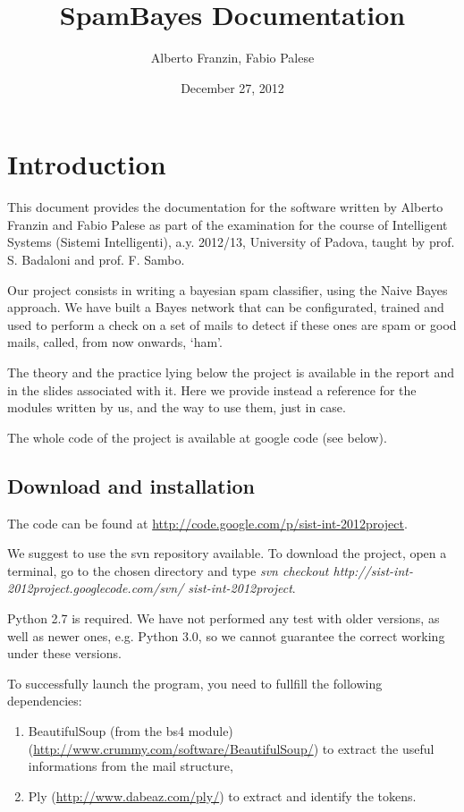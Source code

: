 \documentclass[letterpaper,10pt,english]{sphinxmanual}
\title{SpamBayes Documentation}
\date{December 27, 2012}
\author{Alberto Franzin, Fabio Palese}
\begin{document}
\maketitle
\tableofcontents
{}\label{index::doc}



\chapter{Introduction}
\label{index:introduction}\label{index:spambayes-s-documentation}
This document provides the documentation for the software written by Alberto Franzin and Fabio Palese as part of the examination for the course of Intelligent Systems (Sistemi Intelligenti), a.y. 2012/13, University of Padova, taught by prof. S. Badaloni and prof. F. Sambo.

Our project consists in writing a bayesian spam classifier, using the Naive Bayes approach. We have built a Bayes network that can be configurated, trained and used to perform a check on a set of mails to detect if these ones are spam or good mails, called, from now onwards, `ham'.

The theory and the practice lying below the project is available in the report and in the slides associated with it. Here we provide instead a reference for the modules written by us, and the way to use them, just in case.

The whole code of the project is available at google code (see below).


\section{Download and installation}
\label{index:download-and-installation}
The code can be found at \href{http://code.google.com/p/sist-int-2012project}{http://code.google.com/p/sist-int-2012project}.

We suggest to use the svn repository available. To download the project, open a terminal, go to the chosen directory and type
\emph{svn checkout http://sist-int-2012project.googlecode.com/svn/ sist-int-2012project}.

Python 2.7 is required. We have not performed any test with older versions, as well as newer ones, e.g. Python 3.0, so we cannot guarantee the correct working under these versions.

To successfully launch the program, you need to fullfill the following dependencies:
\begin{enumerate}
\item {} 
BeautifulSoup (from the bs4 module) (\href{http://www.crummy.com/software/BeautifulSoup/}{http://www.crummy.com/software/BeautifulSoup/}) to extract the useful informations from the mail structure,

\item {} 
Ply (\href{http://www.dabeaz.com/ply/}{http://www.dabeaz.com/ply/}) to extract and identify the tokens.

\end{enumerate}
\end{document}
